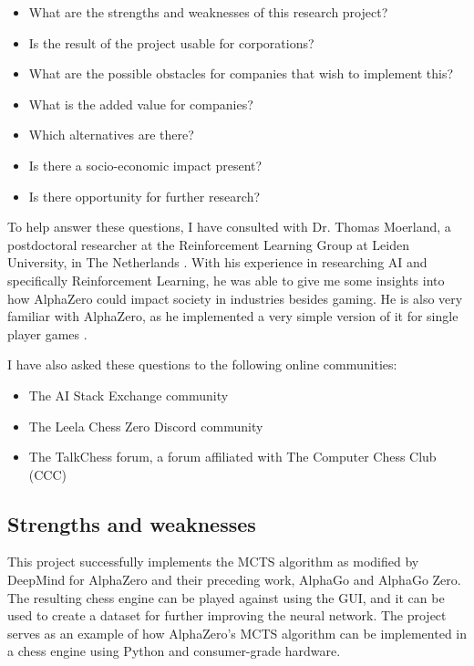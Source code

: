 \documentclass{article}
\begin{document}
\begin{itemize}
    \item What are the strengths and weaknesses of this research project?
    \item Is the result of the project usable for corporations?
    \item What are the possible obstacles for companies that wish to implement this?
    \item What is the added value for companies?
    \item Which alternatives are there?
    \item Is there a socio-economic impact present?
    \item Is there opportunity for further research?
\end{itemize}

To help answer these questions, I have consulted with Dr. Thomas Moerland, a postdoctoral 
researcher at the Reinforcement Learning Group at Leiden University, in The Netherlands \cite{ThomasMoerlandPostdoc}. 
With his experience in researching AI and specifically Reinforcement Learning, he was able 
to give me some insights into how AlphaZero could impact society in industries besides gaming.
He is also very familiar with AlphaZero, as he implemented a very simple version of it for single player games \cite{blogSinglePlayerAlphaZeroa}.

I have also asked these questions to the following online communities:

\begin{itemize}
    \item The AI Stack Exchange community \cite{zjefferHowCanAlphaZero2022,zjefferWhatCanWe2022}
    \item The Leela Chess Zero Discord community \cite{discordLC0Discord}
    \item The TalkChess forum, a forum affiliated with The Computer Chess Club (CCC) \cite{BachelorThesisYour}
\end{itemize}

\subsection{Strengths and weaknesses}

This project successfully implements the MCTS algorithm as modified by DeepMind for AlphaZero and their preceding work,
AlphaGo and AlphaGo Zero. The resulting chess engine can be played against using the GUI, and it can be used to create
a dataset for further improving the neural network. The project serves as an example of how AlphaZero's MCTS algorithm 
can be implemented in a chess engine using Python and consumer-grade hardware. 
\end{document}
